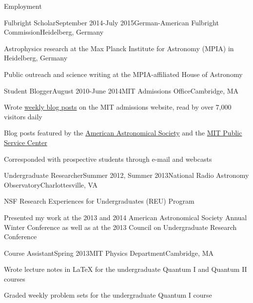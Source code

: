 \documentclass{resume} %
\begin{document}
\begin{rSection}{Employment}

\begin{rSubsection}{Fulbright Scholar}{September 2014-July 2015}{German-American Fulbright Commission}{Heidelberg, Germany}
\item Astrophysics research at the Max Planck Institute for Astronomy (MPIA) in Heidelberg, Germany
\item Public outreach and science writing at the MPIA-affiliated House of Astronomy
\end{rSubsection}

\begin{rSubsection}{Student Blogger}{August 2010-June 2014}{MIT Admissions Office}{Cambridge, MA}
\item Wrote \href{http://mitadmissions.org/blogs/author/annayq/archives}{weekly blog posts} on the MIT admissions website, read by over 7,000 visitors daily
\item Blog posts featured by the \href{https://aas.org/posts/blog/2014/04/congressional-visits-day-undergraduate-perspective}{American Astronomical Society} and the \href{http://web.mit.edu/mitpsc/pressroom/stories/ho.html}{MIT Public Service Center} %
\item Corresponded with prospective students through e-mail and webcasts
\end{rSubsection}

\begin{rSubsection}{Undergraduate Researcher}{Summer 2012, Summer 2013}{National Radio Astronomy Observatory}{Charlottesville, VA}
\item NSF Research Experiences for Undergraduates (REU) Program
\item Presented my work at the 2013 and 2014 American Astronomical Society Annual Winter Conference as well as at the 2013 Council on Undergraduate Research Conference
\end{rSubsection}

\begin{rSubsection}{Course Assistant}{Spring 2013}{MIT Physics Department}{Cambridge, MA}
\item Wrote lecture notes in LaTeX for the undergraduate Quantum I and Quantum II courses
\item Graded weekly problem sets for the undergraduate Quantum I course
\end{rSubsection}

\end{rSection}
\end{document}
